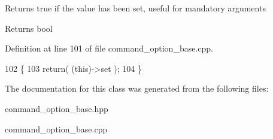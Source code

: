 Returns true if the value has been set, useful for mandatory arguments \begin{DoxyReturn}{Returns}
bool 
\end{DoxyReturn}


Definition at line 101 of file command\+\_\+option\+\_\+base.\+cpp.


\begin{DoxyCode}
102 \{
103    \textcolor{keywordflow}{return}( (\textcolor{keyword}{this})->\textcolor{keyword}{set} );
104 \}
\end{DoxyCode}


The documentation for this class was generated from the following files\+:\begin{DoxyCompactItemize}
\item 
command\+\_\+option\+\_\+base.\+hpp\item 
command\+\_\+option\+\_\+base.\+cpp\end{DoxyCompactItemize}
